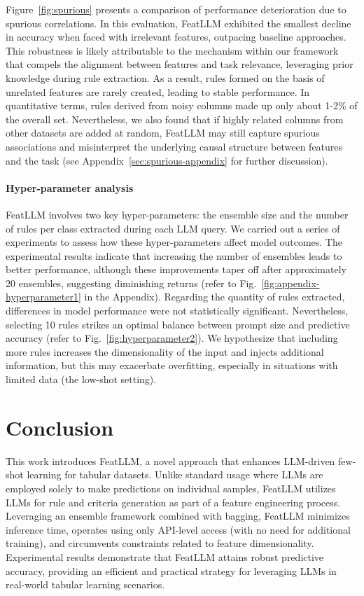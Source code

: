 Figure~\ref{fig:spurious} presents a comparison of performance deterioration due to spurious correlations. In this evaluation, \textsf{FeatLLM} exhibited the smallest decline in accuracy when faced with irrelevant features, outpacing baseline approaches. This robustness is likely attributable to the mechanism within our framework that compels the alignment between features and task relevance, leveraging prior knowledge during rule extraction. As a result, rules formed on the basis of unrelated features are rarely created, leading to stable performance. In quantitative terms, rules derived from noisy columns made up only about 1-2\% of the overall set. Nevertheless, we also found that if highly related columns from other datasets are added at random, \textsf{FeatLLM} may still capture spurious associations and misinterpret the underlying causal structure between features and the task (see Appendix~\ref{sec:spurious-appendix} for further discussion).

\vspace*{-0.12in}
\paragraph{Hyper-parameter analysis}
\textsf{FeatLLM} involves two key hyper-parameters: the ensemble size and the number of rules per class extracted during each LLM query. We carried out a series of experiments to assess how these hyper-parameters affect model outcomes. The experimental results indicate that increasing the number of ensembles leads to better performance, although these improvements taper off after approximately 20 ensembles, suggesting diminishing returns (refer to Fig.~\ref{fig:appendix-hyperparameter1} in the Appendix). Regarding the quantity of rules extracted, differences in model performance were not statistically significant. Nevertheless, selecting 10 rules strikes an optimal balance between prompt size and predictive accuracy (refer to Fig.~\ref{fig:hyperparameter2}). We hypothesize that including more rules increases the dimensionality of the input and injects additional information, but this may exacerbate overfitting, especially in situations with limited data (the low-shot setting).

\section{Conclusion}
This work introduces \textsf{FeatLLM}, a novel approach that enhances LLM-driven few-shot learning for tabular datasets. Unlike standard usage where LLMs are employed solely to make predictions on individual samples, \textsf{FeatLLM} utilizes LLMs for rule and criteria generation as part of a feature engineering process. Leveraging an ensemble framework combined with bagging, \textsf{FeatLLM} minimizes inference time, operates using only API-level access (with no need for additional training), and circumvents constraints related to feature dimensionality. Experimental results demonstrate that \textsf{FeatLLM} attains robust predictive accuracy, providing an efficient and practical strategy for leveraging LLMs in real-world tabular learning scenarios.

